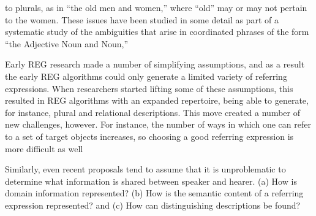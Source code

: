 to plurals, as in “the old men and women,” where “old” may or may not pertain to the
women. These issues have been studied in some detail as part of a systematic study of
the ambiguities that arise in coordinated phrases of the form “the Adjective Noun and
Noun,”  

Early REG research made a number of simplifying assumptions, and as a result the early
REG algorithms could only generate a limited variety of referring expressions. When
researchers started lifting some of these assumptions, this resulted in REG algorithms
with an expanded repertoire, being able to generate, for instance, plural and relational
descriptions. This move created a number of new challenges, however. For instance, the
number of ways in which one can refer to a set of target objects increases, so choosing a
good referring expression is more difficult as well

Similarly, even
recent proposals tend to assume that it is unproblematic to determine what information
is shared between speaker and hearer. 
 (a) How is domain information represented? (b) How is the semantic content
of a referring expression represented? and (c) How can distinguishing descriptions be
found?

